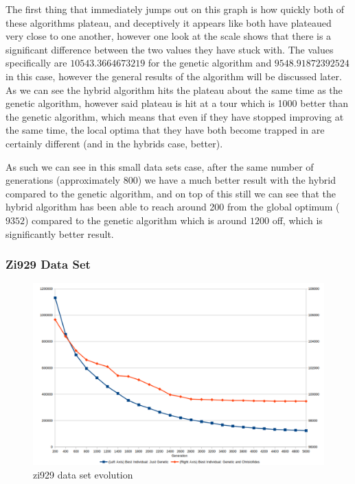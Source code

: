\documentclass[11pt,a4paper,titlepage]{article}
\begin{document}
The first thing that immediately jumps out on this graph is how quickly both of these algorithms plateau, and deceptively it appears like both have plateaued very close to one another, however one look at the scale shows that there is a significant difference between the two values they have stuck with. The values specifically are $10543.3664673219$ for the genetic algorithm and $9548.91872392524$ in this case, however the general results of the algorithm will be discussed later. As we can see the hybrid algorithm hits the plateau about the same time as the genetic algorithm, however said plateau is hit at a tour which is 1000 better than the genetic algorithm, which means that even if they have stopped improving at the same time, the local optima that they have both become trapped in are certainly different (and in the hybrids case, better).

As such we can see in this small data sets case, after the same number of generations (approximately 800) we have a much better result with the hybrid compared to the genetic algorithm, and on top of this still we can see that the hybrid algorithm has been able to reach around 200 from the global optimum ($9352$) compared to the genetic algorithm which is around $1200$ off, which is significantly better result.
\pagebreak

\subsubsection{Zi929 Data Set}

\begin{figure}[ht]
	\includegraphics[width=\textwidth]{zi929Evolution}
	\centering
	\caption{zi929 data set evolution}
\end{figure}
\end{document}
